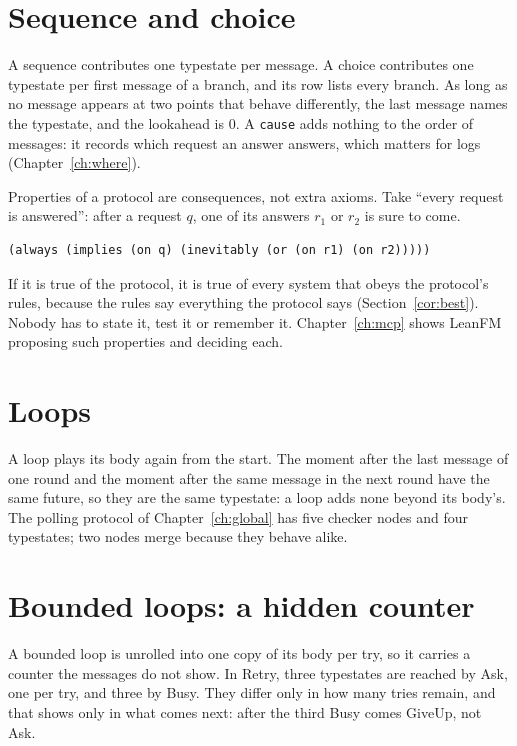 \section{Sequence and choice}\label{prop:answered}

A sequence contributes one typestate per message. A choice contributes one typestate per
first message of a branch, and its row lists every branch. As long as no message appears at
two points that behave differently, the last message names the typestate, and the lookahead
is $0$. A \texttt{cause} adds nothing to the order of messages: it records which request an
answer answers, which matters for logs (Chapter~\ref{ch:where}).

Properties of a protocol are consequences, not extra axioms. Take ``every request is
answered'': after a request $q$, one of its answers $r_1$ or $r_2$ is sure to come.
\begin{lstlisting}[language={},basicstyle=\ttfamily\footnotesize]
(always (implies (on q) (inevitably (or (on r1) (on r2)))))
\end{lstlisting}
If it is true of the protocol, it is true of every system that obeys the protocol's rules,
because the rules say everything the protocol says (Section~\ref{cor:best}). Nobody has to
state it, test it or remember it. Chapter~\ref{ch:mcp} shows LeanFM proposing such
properties and deciding each.

\section{Loops}

A loop plays its body again from the start. The moment after the last message of one round
and the moment after the same message in the next round have the same future, so they are
the same typestate: a loop adds none beyond its body's. The polling protocol of
Chapter~\ref{ch:global} has five checker nodes and four typestates; two nodes merge because
they behave alike.

\section{Bounded loops: a hidden counter}

A bounded loop is unrolled into one copy of its body per try, so it carries a counter the
messages do not show. In Retry, three typestates are reached by Ask, one per try, and three
by Busy. They differ only in how many tries remain, and that shows only in what comes
next: after the third Busy comes GiveUp, not Ask.

